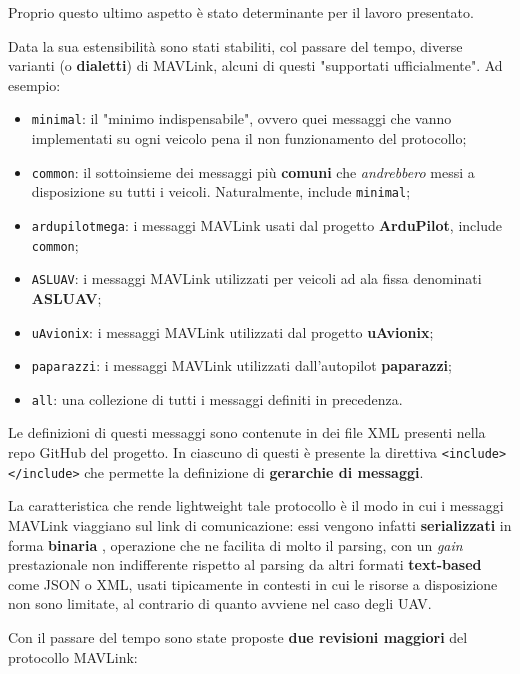 \documentclass[a4paper, 12pt, oneside]{article}
\theoremstyle{definition}
\begin{document}
Proprio questo ultimo aspetto è stato determinante per il lavoro presentato.

Data la sua estensibilità sono stati stabiliti, col passare del tempo, diverse varianti (o \textbf{dialetti}) di MAVLink, alcuni di questi "supportati ufficialmente". Ad esempio:

\begin{itemize}
    \item \texttt{minimal}: il "minimo indispensabile", ovvero quei messaggi che vanno implementati su ogni veicolo pena il non funzionamento del protocollo;
    \item \texttt{common}: il sottoinsieme dei messaggi più \textbf{comuni} che \textit{andrebbero} messi a disposizione su tutti i veicoli. Naturalmente, include \texttt{minimal};
    \item \texttt{ardupilotmega}: i messaggi MAVLink usati dal progetto \textbf{ArduPilot}, include \texttt{common};
    \item \texttt{ASLUAV}: i messaggi MAVLink utilizzati per veicoli ad ala fissa denominati \textbf{ASLUAV};
    \item \texttt{uAvionix}: i messaggi MAVLink utilizzati dal progetto \textbf{uAvionix};
    \item \texttt{paparazzi}: i messaggi MAVLink utilizzati dall'autopilot \textbf{paparazzi};
    \item \texttt{all}: una collezione di tutti i messaggi definiti in precedenza.
\end{itemize}

Le definizioni di questi messaggi sono contenute in dei file XML presenti nella repo GitHub del progetto. In ciascuno di questi è presente la direttiva \texttt{<include></include>} che permette la definizione di \textbf{gerarchie di messaggi}. \cite{mavlink-message-definitions}

La caratteristica che rende lightweight tale protocollo è il modo in cui i messaggi MAVLink viaggiano sul link di comunicazione: essi vengono infatti \textbf{serializzati} in forma \textbf{binaria} \cite{mavlink-overview}, operazione che ne facilita di molto il parsing, con un \textit{gain} prestazionale non indifferente rispetto al parsing da altri formati \textbf{text-based} come JSON o XML, usati tipicamente in contesti in cui le risorse a disposizione non sono limitate, al contrario di quanto avviene nel caso degli UAV.

Con il passare del tempo sono state proposte \textbf{due revisioni maggiori} del protocollo MAVLink:
\end{document}
